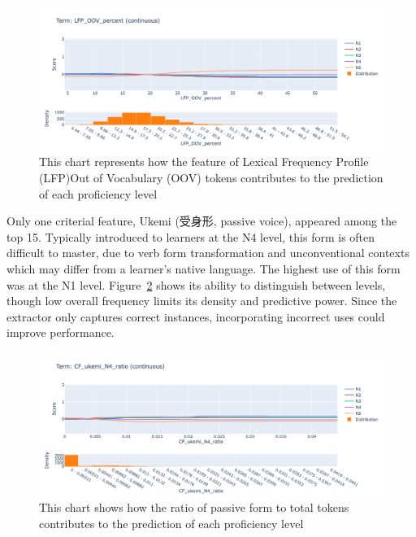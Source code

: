 \begin{figure}[h!]
    \centering
    \includegraphics[scale=.4]{img/EBM/EBMlfpOOV}
    \caption[Contribution of Percentage of Lexical Frequency Profile (LFP)Out of Vocabulary (OOV) tokens]{This chart represents how the feature of Lexical Frequency Profile (LFP)Out of Vocabulary (OOV) tokens contributes to the prediction of each proficiency level}
    \label{fig:EBMlfpOOV}
\end{figure}


Only one criterial feature, Ukemi (受身形, passive voice), appeared among the top 15. Typically introduced to
learners at the N4 level, this form is often difficult to master, due to verb form transformation and unconventional
contexts which may differ from a learner's native language. The highest use of this form was at the N1 level. Figure~\ref{fig:EBMukemi} shows its ability to distinguish between levels, though low overall frequency limits its density and predictive power. Since the extractor only captures correct instances, incorporating incorrect uses could improve performance.

\begin{figure}[h!]
    \centering
    \includegraphics[scale=.4]{img/EBM/EBMukemi}
    \caption[Contribution of ratio of passive form (受身形、ukemi)]{This chart shows how the ratio of passive form to total tokens contributes to the prediction of each proficiency level}
    \label{fig:EBMukemi}
\end{figure}


